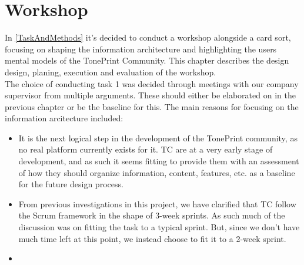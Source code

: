 \chapter{Workshop}
\label{ChapterWorkshop}
In \autoref{TaskAndMethods} it's decided to conduct a workshop alongside a card sort, focusing on shaping the information architecture and highlighting the users mental models of the TonePrint Community. This chapter describes the design design, planing, execution and evaluation of the workshop.\\

\noindent
The choice of conducting task 1 was decided through meetings with our company supervisor from multiple arguments. These should either be elaborated on in the previous chapter or be the baseline for this. The main reasons for focusing on the information arcitecture included:
\begin{itemize}
	\item It is the next logical step in the development of the TonePrint community, as no real platform currently exists for it. TC are at a very early stage of development, and as such it seems fitting to provide them with an assessment of how they should organize information, content, features, etc. as a baseline for the future design process.
	\item From previous investigations in this project, we have clarified that TC follow the Scrum framework in the shape of 3-week sprints. As such much of the discussion was on fitting the task to a typical sprint. But, since we don't have much time left at this point, we instead choose to fit it to a 2-week sprint.
	\item 
\end{itemize}

